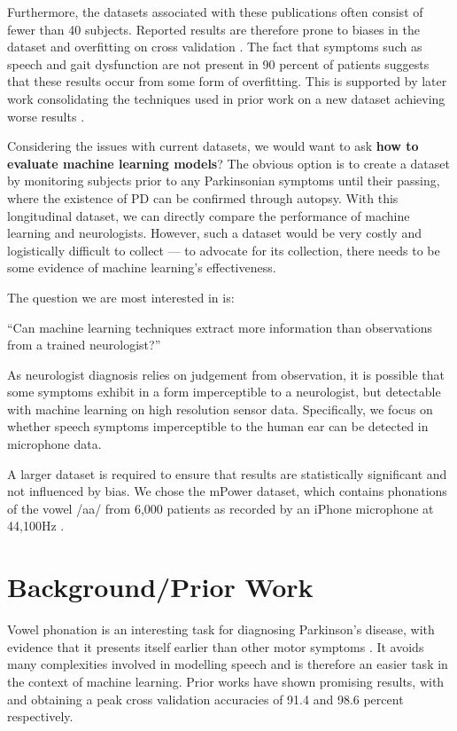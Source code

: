 \documentclass{article}
\begin{document}
Furthermore, the datasets associated with these publications often consist of fewer than 40 subjects. Reported results are therefore prone to biases in the dataset and overfitting on cross validation \cite{overfittingcv}. The fact that symptoms such as speech and gait dysfunction are not present in 90 percent of patients suggests that these results occur from some form of overfitting. This is supported by later work consolidating the techniques used in prior work on a new dataset achieving worse results \cite{zhan2016high}.

Considering the issues with current datasets, we would want to ask \textbf{how to evaluate machine learning models}? The obvious option is to create a dataset by monitoring subjects prior to any Parkinsonian symptoms until their passing, where the existence of PD can be confirmed through autopsy. With this longitudinal dataset, we can directly compare the performance of machine learning and neurologists. However, such a dataset would be very costly and logistically difficult to collect --- to advocate for its collection, there needs to be some evidence of machine learning's effectiveness.


The question we are most interested in is:


\begin{displayquote}
	``Can machine learning techniques extract more information than observations from a trained neurologist?''
\end{displayquote}

As neurologist diagnosis relies on judgement from observation, it is possible that some symptoms exhibit in a form imperceptible to a neurologist, but detectable with machine learning on high resolution sensor data. Specifically, we focus on whether speech symptoms imperceptible to the human ear can be detected in microphone data.

A larger dataset is required to ensure that results are statistically significant and not influenced by bias. We chose the mPower dataset, which contains phonations of the vowel /aa/ from 6,000 patients as recorded by an iPhone microphone at 44,100Hz \cite{mpower}. 


\section{Background/Prior Work}
Vowel phonation is an interesting task for diagnosing Parkinson's disease, with evidence that it presents itself earlier than other motor symptoms \cite{earlyvowel}. It avoids many complexities involved in modelling speech and is therefore an easier task in the context of machine learning. Prior works have shown promising results, with \citealt{splittledysphonia2009} and \citealt{tsanas2012novel} obtaining a peak cross validation accuracies of 91.4 and 98.6 percent respectively.
\end{document}
